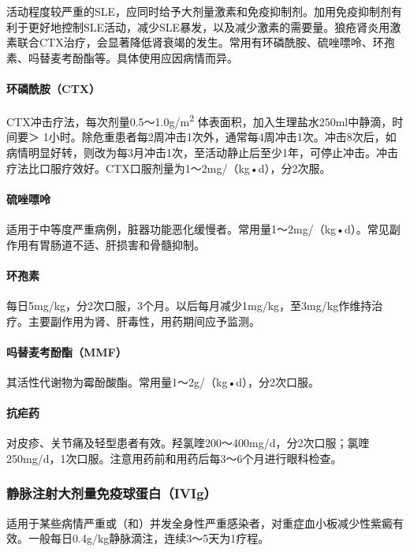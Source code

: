 活动程度较严重的SLE，应同时给予大剂量激素和免疫抑制剂。加用免疫抑制剂有利于更好地控制SLE活动，减少SLE暴发，以及减少激素的需要量。狼疮肾炎用激素联合CTX治疗，会显著降低肾衰竭的发生。常用有环磷酰胺、硫唑嘌呤、环孢素、吗替麦考酚酯等。具体使用应因病情而异。

\paragraph{环磷酰胺（CTX）}

CTX冲击疗法，每次剂量0.5～1.0g/m\textsuperscript{2}
体表面积，加入生理盐水250ml中静滴，时间要＞
1小时。除危重患者每2周冲击1次外，通常每4周冲击1次。冲击8次后，如病情明显好转，则改为每3月冲击1次，至活动静止后至少1年，可停止冲击。冲击疗法比口服疗效好。CTX口服剂量为1～2mg/（kg•d），分2次服。

\paragraph{硫唑嘌呤}

适用于中等度严重病例，脏器功能恶化缓慢者。常用量1～2mg/（kg•d）。常见副作用有胃肠道不适、肝损害和骨髓抑制。

\paragraph{环孢素}

每日5mg/kg，分2次口服，3个月。以后每月减少1mg/kg，至3mg/kg作维持治疗。主要副作用为肾、肝毒性，用药期间应予监测。

\paragraph{吗替麦考酚酯（MMF）}

其活性代谢物为霉酚酸酯。常用量1～2g/（kg•d），分2次口服。

\paragraph{抗疟药}

对皮疹、关节痛及轻型患者有效。羟氯喹200～400mg/d，分2次口服；氯喹250mg/d，1次口服。注意用药前和用药后每3～6个月进行眼科检查。

\subsubsection{静脉注射大剂量免疫球蛋白（IVIg）}

适用于某些病情严重或（和）并发全身性严重感染者，对重症血小板减少性紫癜有效。一般每日0.4g/kg静脉滴注，连续3～5天为1疗程。

